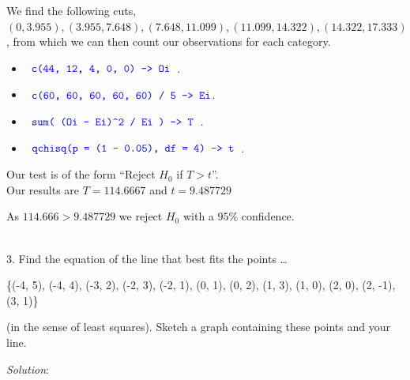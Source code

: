 \documentclass[12pt]{article}
\newcommand{\XB}{\color{black}}
\newcommand{\XBB}{\color{blue}}
\newcommand{\ds}{\displaystyle}
\begin{document}
We find the following cuts, $ (0, 3.955), (3.955, 7.648), (7.648, 11.099), (11.099, 14.322), (14.322,17.333) $,
from which we can then count our observations for each category. \\

\begin{itemize}
    \item $ \ds {\XBB \texttt{ c(44, 12, 4, 0, 0) -> Oi }} $.
    \item $ \ds {\XBB \texttt{ c(60, 60, 60, 60, 60) / 5 -> Ei}} $.
    \item $ \ds {\XBB \texttt{ sum( (Oi - Ei)} \verb|^| \texttt{2 / Ei ) -> T }} $.
    \item $ \ds {\XBB \texttt{ qchisq(p = (1 - 0.05), df = 4) -> t }} $. \\
\end{itemize}

\noindent
Our test is of the form ``Reject $ H_{0} $ if $ T > t $''. \\

Our results are $ T = 114.6667 $ and $ t = 9.487729 $

As $ 114.666 > 9.487729 $ we reject $ H_{0} $ with a $ 95\% $ confidence.

\vspace{2.5mm}

\newpage
\XBB\hrulefill\XB \\

3. Find the equation of the line that best fits the points \dots \\

\begin{center}
    \{(-4, 5), (-4, 4), (-3, 2), (-2, 3), (-2, 1), (0, 1), (0, 2), (1, 3), (1, 0), (2, 0), (2, -1), (3, 1)\}
\end{center}

(in the sense of least squares). Sketch a graph containing these points and your line. \\

\XBB\hrulefill\XB
\vspace{5mm}

\vspace{2.5mm}
\textit{Solution}:
\vspace{2.5mm} \\
\end{document}
